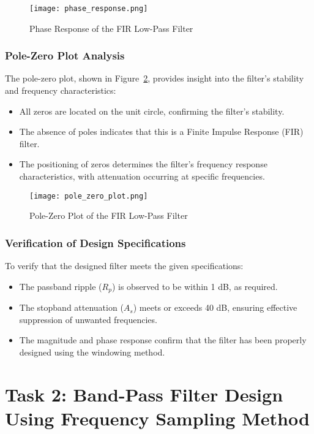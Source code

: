 \documentclass[a4paper,12pt]{article}
\begin{document}
\begin{figure}[H]
    \centering
    \texttt{[image: phase\_response.png]}
    \caption{Phase Response of the FIR Low-Pass Filter}
    \label{fig:phase_response}
\end{figure}

\subsubsection{Pole-Zero Plot Analysis}
The pole-zero plot, shown in Figure~\ref{fig:pole_zero}, provides insight into the filter’s stability and frequency characteristics:
\begin{itemize}
    \item All zeros are located on the unit circle, confirming the filter’s stability.
    \item The absence of poles indicates that this is a Finite Impulse Response (FIR) filter.
    \item The positioning of zeros determines the filter’s frequency response characteristics, with attenuation occurring at specific frequencies.
\end{itemize}


\begin{figure}[H]
    \centering
    \texttt{[image: pole\_zero\_plot.png]}
    \caption{Pole-Zero Plot of the FIR Low-Pass Filter}
    \label{fig:pole_zero}
\end{figure}
\subsubsection{Verification of Design Specifications}
To verify that the designed filter meets the given specifications:
\begin{itemize}
    \item The passband ripple (\( R_p \)) is observed to be within 1 dB, as required.
    \item The stopband attenuation (\( A_s \)) meets or exceeds 40 dB, ensuring effective suppression of unwanted frequencies.
    \item The magnitude and phase response confirm that the filter has been properly designed using the windowing method.
\end{itemize}



\section{Task 2: Band-Pass Filter Design Using Frequency Sampling Method}
\end{document}
